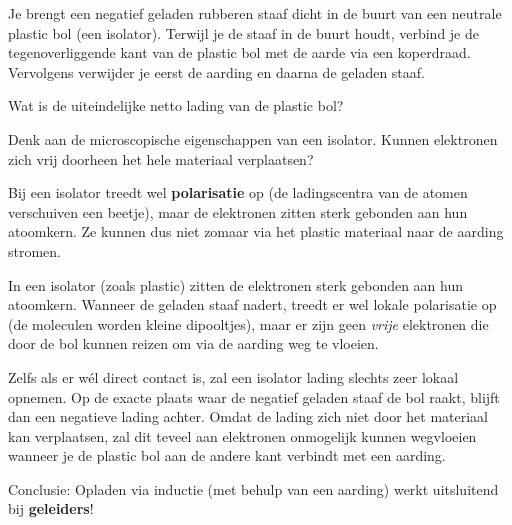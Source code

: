 \documentclass{ximera}
\begin{document}
\begin{question}
    Je brengt een negatief geladen rubberen staaf dicht in de buurt van een neutrale plastic bol (een isolator). Terwijl je de staaf in de buurt houdt, verbind je de tegenoverliggende kant van de plastic bol met de aarde via een koperdraad. Vervolgens verwijder je eerst de aarding en daarna de geladen staaf.
    
    Wat is de uiteindelijke netto lading van de plastic bol?

    \begin{multipleChoice}
    \end{multipleChoice}

    \begin{hint}
        Denk aan de microscopische eigenschappen van een isolator. Kunnen elektronen zich vrij doorheen het hele materiaal verplaatsen?
    \end{hint}
    \begin{hint}
        Bij een isolator treedt wel \textbf{polarisatie} op (de ladingscentra van de atomen verschuiven een beetje), maar de elektronen zitten sterk gebonden aan hun atoomkern. Ze kunnen dus niet zomaar via het plastic materiaal naar de aarding stromen.
    \end{hint}

    \begin{solution}\nl
        In een isolator (zoals plastic) zitten de elektronen sterk gebonden aan hun atoomkern. Wanneer de geladen staaf nadert, treedt er wel lokale polarisatie op (de moleculen worden kleine dipooltjes), maar er zijn geen \emph{vrije} elektronen die door de bol kunnen reizen om via de aarding weg te vloeien.
        
        Zelfs als er wél direct contact is, zal een isolator lading slechts zeer lokaal opnemen. Op de exacte plaats waar de negatief geladen staaf de bol raakt, blijft dan een negatieve lading achter. Omdat de lading zich niet door het materiaal kan verplaatsen, zal dit teveel aan elektronen onmogelijk kunnen wegvloeien wanneer je de plastic bol aan de andere kant verbindt met een aarding.
        
        Conclusie: Opladen via inductie (met behulp van een aarding) werkt uitsluitend bij \textbf{geleiders}!
    \end{solution}
\end{question}
\end{document}

